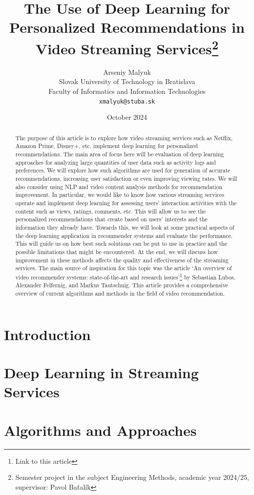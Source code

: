 \documentclass[12pt,english,a4paper]{article}
\title{The Use of Deep Learning for Personalized Recommendations in Video Streaming Services\thanks{Semester project in the subject Engineering Methods, academic year 2024/25, supervisor: Pavol Baťalík}}
\author{Arseniy Malyuk\\[2pt]
	{\small Slovak University of Technology in Bratislava}\\
	{\small Faculty of Informatics and Information Technologies}\\
	{\small \texttt{xmalyuk@stuba.sk}}
	}
\date{\small October 2024}
\begin{document}
\maketitle

\begin{abstract}
    The purpose of this article is to explore how video streaming services such as Netflix, Amazon Prime, Disney+, etc. implement deep learning for personalized recommendations. The main area of focus here will be evaluation of deep learning approaches for analyzing large quantities of user data such as activity logs and preferences. We will explore how such algorithms are used for generation of accurate recommendations, increasing user satisfaction or even improving viewing rates. We will also consider using NLP and video content analysis methods for recommendation improvement. In particular, we would like to know how various streaming services operate and implement deep learning for assessing users’ interaction activities with the content such as views, ratings, comments, etc. This will allow us to see the personalized recommendations that create based on users’ interests and the information they already have. Towards this, we will look at some practical aspects of the deep learning application in recommender systems and evaluate the performance. This will guide us on how best such solutions can be put to use in practice and the possible limitations that might be encountered. At the end, we will discuss how improvement in these methods affects the quality and effectiveness of the streaming services. The main source of inspiration for this topic was the article ‘An overview of video recommender systems: state-of-the-art and research issues’\cite{SAM-Overview}\footnote{Link to this article} by Sebastian Lubos, Alexander Felfernig, and Markus Tautschnig. This article provides a comprehensive overview of current algorithms and methods in the field of video recommendation.
\end{abstract}

\section{Introduction}

\section{Deep Learning in Streaming Services}

\section{Algorithms and Approaches}
\end{document}
